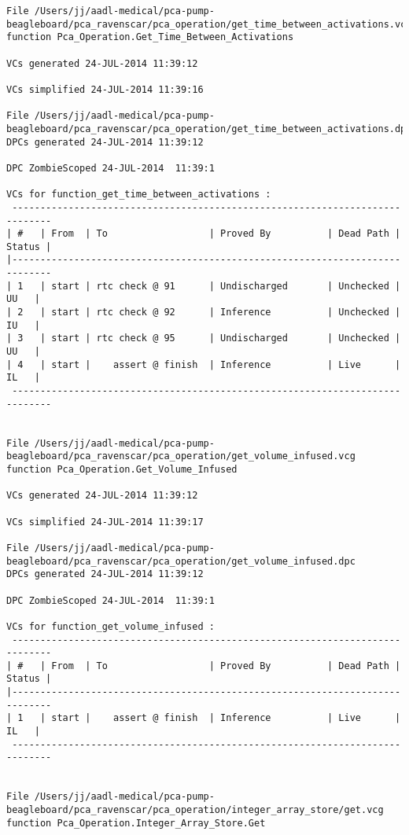 \begin{lstlisting}[frame=single, gobble=0, caption={POGS report for PCA Pump prototype}]
File /Users/jj/aadl-medical/pca-pump-beagleboard/pca_ravenscar/pca_operation/get_time_between_activations.vcg
function Pca_Operation.Get_Time_Between_Activations

VCs generated 24-JUL-2014 11:39:12

VCs simplified 24-JUL-2014 11:39:16

File /Users/jj/aadl-medical/pca-pump-beagleboard/pca_ravenscar/pca_operation/get_time_between_activations.dpc
DPCs generated 24-JUL-2014 11:39:12

DPC ZombieScoped 24-JUL-2014  11:39:1

VCs for function_get_time_between_activations :
 -----------------------------------------------------------------------------
| #   | From  | To                  | Proved By          | Dead Path | Status |
|-----------------------------------------------------------------------------
| 1   | start | rtc check @ 91      | Undischarged       | Unchecked |   UU   |
| 2   | start | rtc check @ 92      | Inference          | Unchecked |   IU   |
| 3   | start | rtc check @ 95      | Undischarged       | Unchecked |   UU   |
| 4   | start |    assert @ finish  | Inference          | Live      |   IL   |
 -----------------------------------------------------------------------------


File /Users/jj/aadl-medical/pca-pump-beagleboard/pca_ravenscar/pca_operation/get_volume_infused.vcg
function Pca_Operation.Get_Volume_Infused

VCs generated 24-JUL-2014 11:39:12

VCs simplified 24-JUL-2014 11:39:17

File /Users/jj/aadl-medical/pca-pump-beagleboard/pca_ravenscar/pca_operation/get_volume_infused.dpc
DPCs generated 24-JUL-2014 11:39:12

DPC ZombieScoped 24-JUL-2014  11:39:1

VCs for function_get_volume_infused :
 -----------------------------------------------------------------------------
| #   | From  | To                  | Proved By          | Dead Path | Status |
|-----------------------------------------------------------------------------
| 1   | start |    assert @ finish  | Inference          | Live      |   IL   |
 -----------------------------------------------------------------------------


File /Users/jj/aadl-medical/pca-pump-beagleboard/pca_ravenscar/pca_operation/integer_array_store/get.vcg
function Pca_Operation.Integer_Array_Store.Get


\end{lstlisting}
